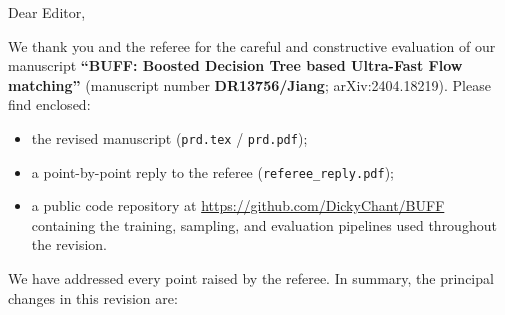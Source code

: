 \documentclass[11pt]{article}
\begin{document}
\noindent
Dear Editor,
\bigskip

\noindent
We thank you and the referee for the careful and constructive evaluation of
our manuscript \textbf{``BUFF: Boosted Decision Tree based Ultra-Fast Flow
matching''} (manuscript number \textbf{DR13756/Jiang}; arXiv:2404.18219).
Please find enclosed:
\begin{itemize}
  \item the revised manuscript (\texttt{prd.tex} / \texttt{prd.pdf});
  \item a point-by-point reply to the referee (\texttt{referee\_reply.pdf});
  \item a public code repository at
        \url{https://github.com/DickyChant/BUFF} containing the training,
        sampling, and evaluation pipelines used throughout the revision.
\end{itemize}

\bigskip
\noindent
We have addressed every point raised by the referee.  In summary, the
principal changes in this revision are:
\end{document}
